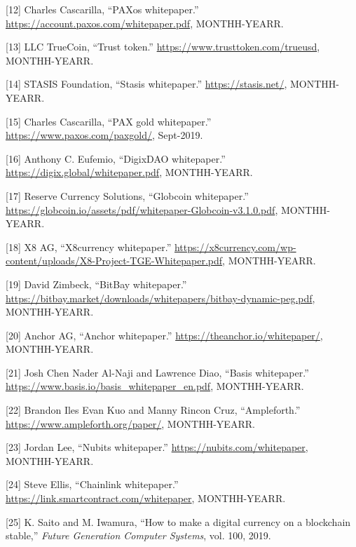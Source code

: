 \documentclass[english,]{IEEEtran}
\begin{document}
\hypertarget{ref-PAXos:whitepaper}{}
{[}12{]} Charles Cascarilla, ``PAXos whitepaper.''
\url{https://account.paxos.com/whitepaper.pdf}, MONTHH-YEARR.

\hypertarget{ref-TrueUSD:whitepaper}{}
{[}13{]} LLC TrueCoin, ``Trust token.''
\url{https://www.trusttoken.com/trueusd}, MONTHH-YEARR.

\hypertarget{ref-Stasis:whitepaper}{}
{[}14{]} STASIS Foundation, ``Stasis whitepaper.''
\url{https://stasis.net/}, MONTHH-YEARR.

\hypertarget{ref-PAXGold:whitepaper}{}
{[}15{]} Charles Cascarilla, ``PAX gold whitepaper.''
\url{https://www.paxos.com/paxgold/}, Sept-2019.

\hypertarget{ref-DigixDAO:whitepaper}{}
{[}16{]} Anthony C. Eufemio, ``DigixDAO whitepaper.''
\url{https://digix.global/whitepaper.pdf}, MONTHH-YEARR.

\hypertarget{ref-globcoin:whitepaper}{}
{[}17{]} Reserve Currency Solutions, ``Globcoin whitepaper.''
\url{https://globcoin.io/assets/pdf/whitepaper-Globcoin-v3.1.0.pdf},
MONTHH-YEARR.

\hypertarget{ref-x8currency:whitepaper}{}
{[}18{]} X8 AG, ``X8currency whitepaper.''
\url{https://x8currency.com/wp-content/uploads/X8-Project-TGE-Whitepaper.pdf},
MONTHH-YEARR.

\hypertarget{ref-BitBay:whitepaper}{}
{[}19{]} David Zimbeck, ``BitBay whitepaper.''
\url{https://bitbay.market/downloads/whitepapers/bitbay-dynamic-peg.pdf},
MONTHH-YEARR.

\hypertarget{ref-Anchor:whitepaper}{}
{[}20{]} Anchor AG, ``Anchor whitepaper.''
\url{https://theanchor.io/whitepaper/}, MONTHH-YEARR.

\hypertarget{ref-Basis:whitepaper}{}
{[}21{]} Josh Chen Nader Al-Naji and Lawrence Diao, ``Basis
whitepaper.'' \url{https://www.basis.io/basis_whitepaper_en.pdf},
MONTHH-YEARR.

\hypertarget{ref-Ampleforth:whitepaper}{}
{[}22{]} Brandon Iles Evan Kuo and Manny Rincon Cruz, ``Ampleforth.''
\url{https://www.ampleforth.org/paper/}, MONTHH-YEARR.

\hypertarget{ref-Nubits:whitepaper}{}
{[}23{]} Jordan Lee, ``Nubits whitepaper.''
\url{https://nubits.com/whitepaper}, MONTHH-YEARR.

\hypertarget{ref-Chainlink:whitepaper}{}
{[}24{]} Steve Ellis, ``Chainlink whitepaper.''
\url{https://link.smartcontract.com/whitepaper}, MONTHH-YEARR.

\hypertarget{ref-How_to_make_a_digital_currency_on_a_blockchain_stable}{}
{[}25{]} K. Saito and M. Iwamura, ``How to make a digital currency on a
blockchain stable,'' \emph{Future Generation Computer Systems}, vol.
100, 2019.
\end{document}
